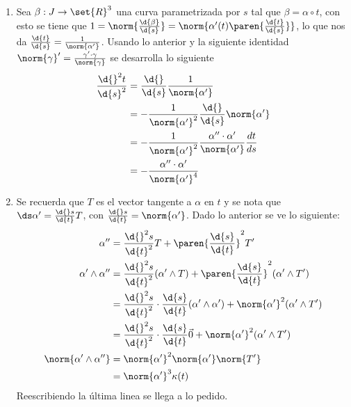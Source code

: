 \documentclass{homework}
\begin{document}
\begin{sol}
    \begin{enumerate}
        \item Sea \(\beta:J\rightarrow\set{R}^3\) una curva parametrizada por \(s\) tal que \(\beta=\alpha\circ t\), con esto se tiene que \(1=\norm{\frac{\d{\beta}}{\d{s}}}=\norm{\alpha'(t)\paren{\frac{\d{t}}{\d{s}}}}\), lo que nos da \(\frac{\d{t}}{\d{s}}=\frac1{\norm{\alpha'}}\). Usando lo anterior y la siguiente identidad \(\norm{\gamma}'=\frac{\gamma'\cdot \gamma}{\norm{\gamma}}\) se desarrolla lo siguiente
              \begin{align*}
                  \frac{\d{}^2t}{\d{s}^2} & =\frac{\d{}}{\d{s}}\frac1{\norm{\alpha'}}                                               \\
                                          & =-\frac1{\norm{\alpha'}^2}\frac{\d{}}{\d{s}}\norm{\alpha'}                              \\
                                          & =-\frac1{\norm{\alpha'}^2}\frac{\alpha''\cdot \alpha'}{\norm{\alpha'}}\frac{d{t}}{d{s}} \\
                                          & =-\frac{\alpha''\cdot \alpha'}{\norm{\alpha'}^4}
              \end{align*}
        \item Se recuerda que \(T\) es el vector tangente a \(\alpha\) en \(t\) y se nota que \(\ds\alpha'=\frac{\d{}s}{\d{t}}T\), con \(\frac{\d{}s}{\d{t}}=\norm{\alpha'}\). Dado lo anterior se ve lo siguiente:
              \begin{align*}
                  \alpha''                     & =\frac{\d{}^2s}{\d{t}^2}T+\paren{\frac{\d{s}}{\d{t}}}^2T'                                                  \\
                  \alpha'\wedge\alpha''        & =\frac{\d{}^2s}{\d{t}^2}(\alpha'\wedge T)+\paren{\frac{\d{s}}{\d{t}}}^2(\alpha'\wedge T')                  \\
                                               & =\frac{\d{}^2s}{\d{t}^2}\cdot\frac{\d{s}}{\d{t}}(\alpha'\wedge \alpha')+\norm{\alpha'}^2(\alpha'\wedge T') \\
                                               & =\frac{\d{}^2s}{\d{t}^2}\cdot\frac{\d{s}}{\d{t}}\vec{0}+\norm{\alpha'}^2(\alpha'\wedge T')                 \\
                  \norm{\alpha'\wedge\alpha''} & =\norm{\alpha'}^2\norm{\alpha'}\norm{T'}                                                                   \\
                                               & =\norm{\alpha'}^3\kappa(t)
              \end{align*}
              Reescribiendo la última linea se llega a lo pedido.
    \end{enumerate}
\end{sol}
\end{document}
